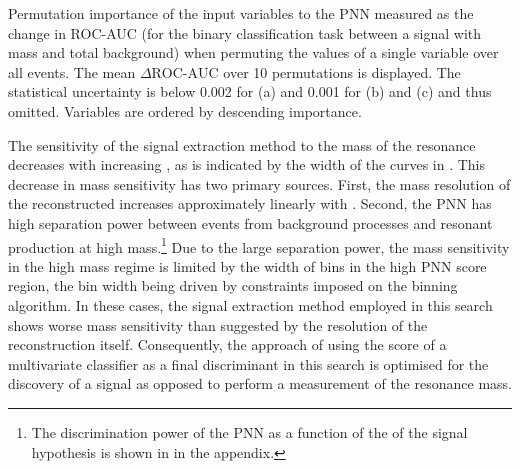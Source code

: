 \begin{table}[htbp]
  \centering

  \caption[Importance of the input variables in the PNN
  discriminant.]{Permutation importance of the input variables to the PNN
    measured as the change in ROC-AUC (for the binary classification task
    between a signal with mass \mX and total background) when permuting the
    values of a single variable over all events. The mean $\Delta\text{ROC-AUC}$
    over 10 permutations is displayed. The statistical uncertainty is below
    0.002 for (a) and 0.001 for (b) and (c) and thus omitted.  Variables are
    ordered by descending importance.}%
  \label{tab:pnn_ranking}

  \begin{subtable}[t]{.33\textwidth}
    \centering
    \renewcommand{\arraystretch}{1.12}
    
  \end{subtable}%
  \begin{subtable}[t]{.33\textwidth}
    \centering
    \renewcommand{\arraystretch}{1.12}
    
  \end{subtable}%
  \begin{subtable}[t]{.33\textwidth}
    \centering
    \renewcommand{\arraystretch}{1.12}
    
  \end{subtable}

\end{table}

The sensitivity of the signal extraction method to the mass of the
resonance decreases with increasing \mX, as is indicated by the width
of the curves in . This decrease in mass
sensitivity has two primary sources. First, the mass resolution of the
reconstructed \mHH increases approximately linearly with \mX. Second,
the PNN has high separation power between events from background
processes and resonant \HH production at high mass.\footnote{The
  discrimination power of the PNN as a function of the \mX of the
  signal hypothesis is shown in  in the
  appendix.}  Due to the large separation power, the mass sensitivity
in the high mass regime is limited by the width of bins in the high
PNN score region, the bin width being driven by constraints imposed on
the binning algorithm. In these cases, the signal extraction method
employed in this search shows worse mass sensitivity than suggested by
the resolution of the \mHH reconstruction itself. Consequently, the
approach of using the score of a multivariate classifier as a final
discriminant in this search is optimised for the discovery of a signal
as opposed to perform a measurement of the resonance mass.

